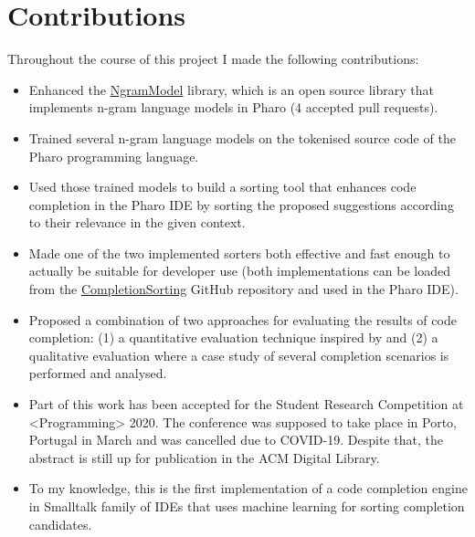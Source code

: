 \section{Contributions}
\label{sec:Introduction-Contributions}
Throughout the course of this project I made the following contributions:
\begin{itemize}
    \item Enhanced the \href{https://github.com/pharo-ai/NgramModel}{NgramModel} library, which is an open source library that implements n-gram language models in Pharo (4 accepted pull requests).
    \item Trained several n-gram language models on the tokenised source code of the Pharo programming language.
    \item Used those trained models to build a sorting tool that enhances code completion in the Pharo IDE by sorting the proposed suggestions according to their relevance in the given context.
    \item Made one of the two implemented sorters both effective and fast enough to actually be suitable for developer use (both implementations can be loaded from the \href{https://github.com/myroslavarm/CompletionSorting}{CompletionSorting} GitHub repository and used in the Pharo IDE).
    \item Proposed a combination of two approaches for evaluating the results of code completion: (1) a quantitative evaluation technique inspired by \cite{Robb08a} and (2) a qualitative evaluation where a case study of several completion scenarios is performed and analysed.
    \item Part of this work has been accepted for the Student Research Competition at <Programming> 2020. The conference was supposed to take place in Porto, Portugal in March and was cancelled due to COVID-19. Despite that, the abstract is still up for publication in the ACM Digital Library.
    \item To my knowledge, this is the first implementation of a code completion engine in Smalltalk family of IDEs that uses machine learning for sorting completion candidates.
\end{itemize}

